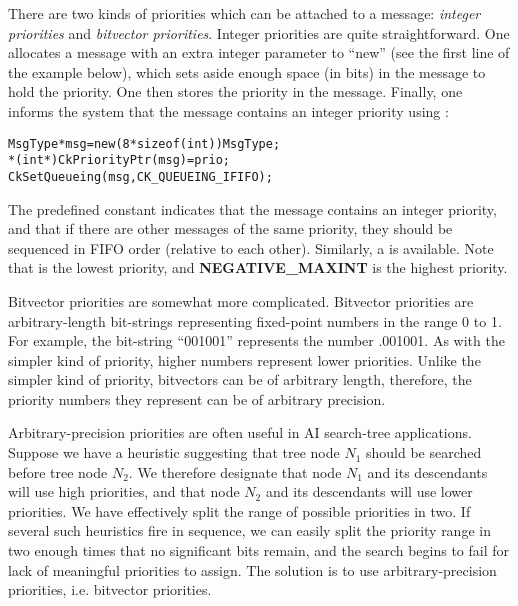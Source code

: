 
There are two kinds of priorities which can be attached to a message: {\sl
integer priorities} and {\sl bitvector
priorities}.  Integer priorities are quite
straightforward.  One allocates a message with an extra integer parameter to
``new'' (see the first line of the example below), which sets aside enough
space (in bits) in the message to hold the priority.  One then stores the
priority in the message.  Finally, one informs the system that the message
contains an integer priority using :

\begin{alltt}
  MsgType *msg = new (8*sizeof(int)) MsgType;
  *(int*)CkPriorityPtr(msg) = prio;
  CkSetQueueing(msg, CK_QUEUEING_IFIFO);
\end{alltt}

The predefined constant   indicates that the
message contains an integer priority, and that if there are other
messages of the same priority, they should be sequenced in FIFO order
(relative to each other).  Similarly, a   is
available.  Note that   is the lowest priority, and {\bf
NEGATIVE\_MAXINT} is the highest priority.

Bitvector priorities are somewhat more complicated.  Bitvector
priorities are arbitrary-length bit-strings representing fixed-point
numbers in the range 0 to 1.  For example, the bit-string ``001001''
represents the number .001001\raisebox{-.5ex}{\scriptsize binary}.  As
with the simpler kind of priority, higher numbers represent lower
priorities.  Unlike the simpler kind of priority, bitvectors can be of
arbitrary length, therefore, the priority numbers they represent can
be of arbitrary precision.

Arbitrary-precision priorities
are often useful in AI search-tree applications.  Suppose we have a
heuristic suggesting that tree node $N_1$ should be searched before
tree node $N_2$.  We therefore designate that node $N_1$ and its
descendants will use high priorities, and that node $N_2$ and its
descendants will use lower priorities.  We have effectively split the
range of possible priorities in two.  If several such heuristics fire
in sequence, we can easily split the priority range  in two enough times that no significant bits remain,
and the search begins to fail for lack of meaningful priorities to
assign.  The solution is to use arbitrary-precision priorities,
i.e. bitvector priorities.

